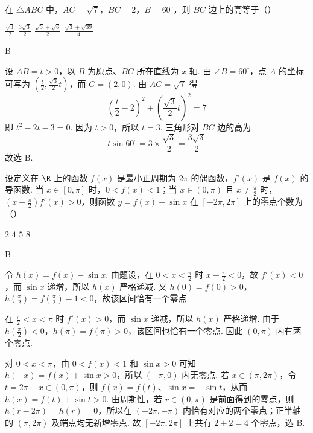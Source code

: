 \begin{problem}
在 \(\triangle ABC\) 中，\(AC = \sqrt{7}\)，\(BC = 2\)，\(B = 60^{\circ}\)，则 \(BC\) 边上的高等于（\quad）

\choices
    {\(\frac{\sqrt{3}}{2}\)}
    {\(\frac{3\sqrt{3}}{2}\)}
    {\(\frac{\sqrt{3} + \sqrt{6}}{2}\)}
    {\(\frac{\sqrt{3} + \sqrt{39}}{4}\)}
\end{problem}

\begin{answer}
B
\end{answer}

\begin{solution}
设 \(AB=t>0\)，以 \(B\) 为原点、\(BC\) 所在直线为 \(x\) 轴. 由
\(\angle B=60^\circ\)，点 \(A\) 的坐标可写为
\(\left(\frac t2,\frac{\sqrt3}{2}t\right)\)，而 \(C=(2,0)\). 由
\(AC=\sqrt7\) 得
\[
\left(\frac t2-2\right)^2+\left(\frac{\sqrt3}{2}t\right)^2=7
\]
即 \(t^2-2t-3=0\). 因为 \(t>0\)，所以 \(t=3\). 三角形对 \(BC\) 边的高为
\[
t\sin60^\circ=3\times\frac{\sqrt3}{2}=\frac{3\sqrt3}{2}
\]
故选 B.
\end{solution}

\begin{problem}
设定义在 \(\R\) 上的函数 \(f(x)\) 是最小正周期为 \(2\pi\) 的偶函数，\(f'(x)\) 是 \(f(x)\) 的导函数. 当 \(x \in [0, \pi]\) 时，\(0 < f(x) < 1\)；当 \(x \in (0, \pi)\) 且 \(x \neq \frac{\pi}{2}\) 时，\(\left(x - \frac{\pi}{2}\right)f'(x) > 0\)，则函数 \(y = f(x) - \sin x\) 在 \([-2\pi, 2\pi]\) 上的零点个数为（\quad）

\choices
    {\(2\)}
    {\(4\)}
    {\(5\)}
    {\(8\)}
\end{problem}

\begin{answer}
B
\end{answer}

\begin{solution}
令 \(h(x)=f(x)-\sin x\). 由题设，在 \(0<x<\frac\pi2\) 时
\(x-\frac\pi2<0\)，故 \(f'(x)<0\)，而 \(\sin x\) 递增，所以 \(h(x)\) 严格递减. 又
\(h(0)=f(0)>0\)，\(h(\frac\pi2)=f(\frac\pi2)-1<0\)，故该区间恰有一个零点.

在 \(\frac\pi2<x<\pi\) 时 \(f'(x)>0\)，而 \(\sin x\) 递减，所以 \(h(x)\) 严格递增. 由于
\(h(\frac\pi2)<0\)，\(h(\pi)=f(\pi)>0\)，该区间也恰有一个零点. 因此 \((0,\pi)\) 内有两个零点.

对 \(0<x<\pi\)，由 \(0<f(x)<1\) 和 \(\sin x>0\) 可知
\(h(-x)=f(x)+\sin x>0\)，所以 \((-\pi,0)\) 内无零点. 若 \(x\in(\pi,2\pi)\)，令 \(t=2\pi-x\in(0,\pi)\)，则
\(f(x)=f(t)\)、\(\sin x=-\sin t\)，从而 \(h(x)=f(t)+\sin t>0\). 由周期性，若 \(r\in(0,\pi)\) 是前面得到的零点，则 \(h(r-2\pi)=h(r)=0\)，所以在 \((-2\pi,-\pi)\) 内恰有对应的两个零点；正半轴的 \((\pi,2\pi)\) 及端点均无新增零点. 故 \([-2\pi,2\pi]\) 上共有 \(2+2=4\) 个零点，选 B.
\end{solution}

